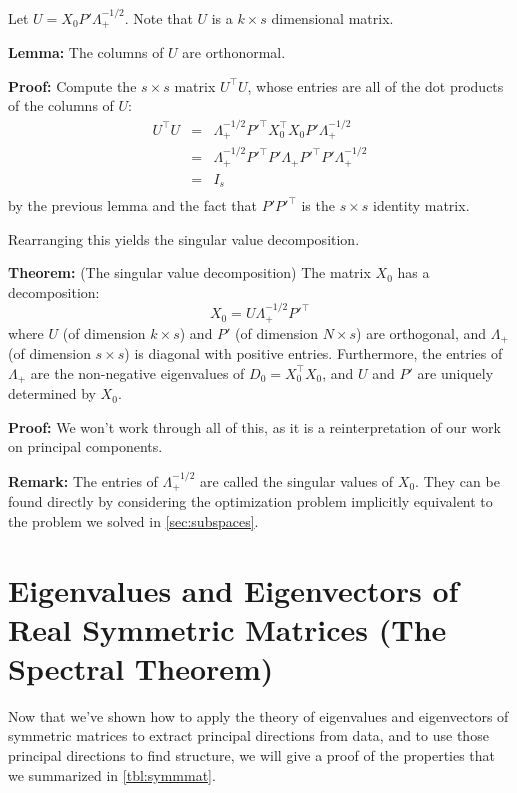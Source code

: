 \documentclass[
  oneside]{scrbook}
\begin{document}
Let \(U = X_{0}P'\Lambda_{+}^{-1/2}\). Note that \(U\) is a
\(k\times s\) dimensional matrix.

\textbf{Lemma:} The columns of \(U\) are orthonormal.

\textbf{Proof:} Compute the \(s\times s\) matrix \(U^{\intercal}U\),
whose entries are all of the dot products of the columns of \(U\): \[
\begin{aligned}
U^{\intercal}U &=& \Lambda_{+}^{-1/2}P'^{\intercal}X_{0}^{\intercal}X_{0}P'\Lambda_{+}^{-1/2} \\
&=& \Lambda_{+}^{-1/2}P'^{\intercal}P'\Lambda_{+}P'^{\intercal}P'\Lambda_{+}^{-1/2} \\
&=& I_{s} \\
\end{aligned}
\] by the previous lemma and the fact that \(P'P'^{\intercal}\) is the
\(s\times s\) identity matrix.

Rearranging this yields the singular value decomposition.

\textbf{Theorem:} (The singular value decomposition) The matrix
\(X_{0}\) has a decomposition: \[
X_{0} = U\Lambda_{+}^{-1/2}P'^{\intercal}
\] where \(U\) (of dimension \(k\times s\)) and \(P'\) (of dimension
\(N\times s\)) are orthogonal, and \(\Lambda_{+}\) (of dimension
\(s\times s\)) is diagonal with positive entries. Furthermore, the
entries of \(\Lambda_{+}\) are the non-negative eigenvalues of
\(D_{0}=X_{0}^{\intercal}X_{0}\), and \(U\) and \(P'\) are uniquely
determined by \(X_{0}\).

\textbf{Proof:} We won't work through all of this, as it is a
reinterpretation of our work on principal components.

\textbf{Remark:} The entries of \(\Lambda_{+}^{-1/2}\) are called the
singular values of \(X_{0}\). They can be found directly by considering
the optimization problem implicitly equivalent to the problem we solved
in \cref{sec:subspaces}.

\hypertarget{sec:spectraltheorem}{%
\section{Eigenvalues and Eigenvectors of Real Symmetric Matrices (The
Spectral Theorem)}\label{sec:spectraltheorem}}

Now that we've shown how to apply the theory of eigenvalues and
eigenvectors of symmetric matrices to extract principal directions from
data, and to use those principal directions to find structure, we will
give a proof of the properties that we summarized in \cref{tbl:symmmat}.
\end{document}
